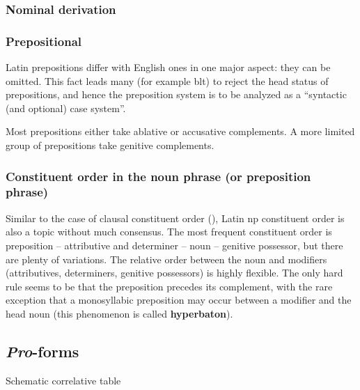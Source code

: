 \documentclass{article}
\newcommand*{\concept}[1]{\textbf{#1}}
\newcommand*{\term}[1]{\emph{#1}}
\begin{document}
\subsubsection{Nominal derivation}


\subsubsection{Prepositional}\label{sec:prep-abs}

Latin prepositions differ with English ones in one major aspect:
they can be omitted.
This fact leads many (for example \ac{blt}) to reject the head status of prepositions,
and hence the preposition system is to be analyzed as a ``syntactic (and optional) case system''. 

Most prepositions either take ablative or accusative complements.
A more limited group of prepositions take genitive complements.

\subsubsection{Constituent order in the noun phrase (or preposition phrase)}

Similar to the case of clausal constituent order (), 
Latin \ac{np} constituent order is also a topic without much consensus.
The most frequent constituent order is preposition -- attributive and determiner -- noun -- genitive possessor,
but there are plenty of variations.
The relative order between the noun and modifiers (attributives, determiners, genitive possessors)
is highly flexible.
The only hard rule seems to be that the preposition precedes its complement,
with the rare exception that a monosyllabic preposition may occur between a modifier and the head noun
(this phenomenon is called \concept{hyperbaton}).

\subsection{\term{Pro}-forms}\label{sec:pro-abs}

\begin{table}
    \caption{Schematic correlative table}
    \label{tbl:pro-form-scheme}
    \centering
    
\end{table}
\end{document}

